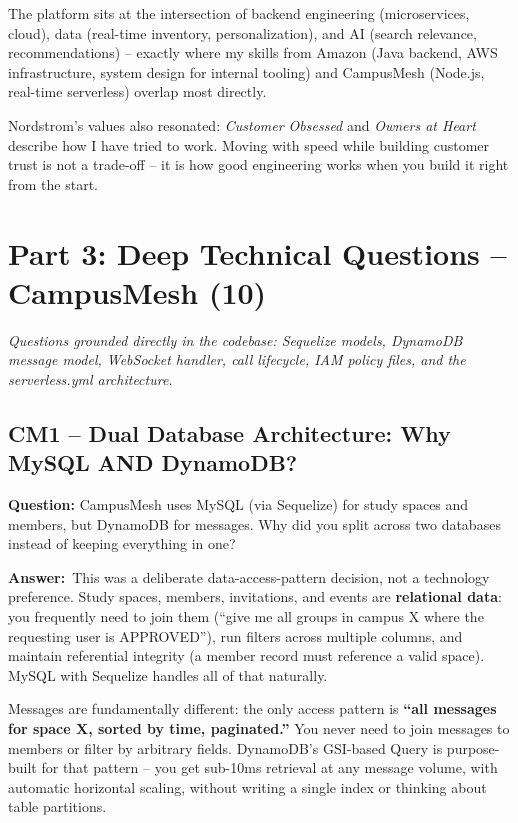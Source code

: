 \documentclass[letterpaper,10pt]{article}
\newlength{\boxwidth}
\newcommand{\questionbox}[1]{%
  \vspace{6pt}%
  \noindent\colorbox{qbg}{%
    \begin{minipage}{\boxwidth}%
      \vspace{3pt}\textbf{\textcolor{nordblue}{Question:}} #1\vspace{3pt}%
    \end{minipage}%
  }\vspace{2pt}%
}
\newcommand{\answerlabel}{\noindent\textbf{\textcolor{answerblue}{Answer:}}~}
\begin{document}
The platform sits at the intersection of backend engineering (microservices, cloud), data (real-time inventory, personalization), and AI (search relevance, recommendations) -- exactly where my skills from Amazon (Java backend, AWS infrastructure, system design for internal tooling) and CampusMesh (Node.js, real-time serverless) overlap most directly.

Nordstrom's values also resonated: \textit{Customer Obsessed} and \textit{Owners at Heart} describe how I have tried to work. Moving with speed while building customer trust is not a trade-off -- it is how good engineering works when you build it right from the start.

\newpage

\section{Part 3: Deep Technical Questions -- CampusMesh (10)}

\noindent\textit{Questions grounded directly in the codebase: Sequelize models, DynamoDB message model, WebSocket handler, call lifecycle, IAM policy files, and the serverless.yml architecture.}
\vspace{4pt}

\subsection*{CM1 -- Dual Database Architecture: Why MySQL AND DynamoDB?}

\questionbox{CampusMesh uses MySQL (via Sequelize) for study spaces and members, but DynamoDB for messages. Why did you split across two databases instead of keeping everything in one?}

\answerlabel This was a deliberate data-access-pattern decision, not a technology preference. Study spaces, members, invitations, and events are \textbf{relational data}: you frequently need to join them (``give me all groups in campus X where the requesting user is APPROVED''), run filters across multiple columns, and maintain referential integrity (a member record must reference a valid space). MySQL with Sequelize handles all of that naturally.

Messages are fundamentally different: the only access pattern is \textbf{``all messages for space X, sorted by time, paginated.''} You never need to join messages to members or filter by arbitrary fields. DynamoDB's GSI-based Query is purpose-built for that pattern -- you get sub-10ms retrieval at any message volume, with automatic horizontal scaling, without writing a single index or thinking about table partitions.
\end{document}
